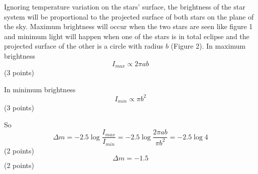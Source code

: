
Ignoring temperature variation on the stars' surface, the brightness of the
star system will be proportional to the projected surface of both stars on the
plane of the sky. Maximum brightness will occur when the two stars are seen
like figure 1 and minimum light will happen when one of the stars is in total
eclipse and the projected surface of the other is a circle with radius $b$
(Figure 2). In maximum brightness
\[ I_{max} \propto 2\pi a b \]
\hfill(3 points)

In minimum brightness
\[ I_{min} \propto \pi b^2 \]
\hfill(3 points)

So
\[ \Delta m = -2.5\log\frac{I_{max}}{I_{min}}
   = -2.5\log\frac{2\pi ab}{\pi b^2}
   = -2.5\log 4 \]
\hfill(2 points)
\[ \Delta m = -1.5 \]
\hfill(2 points)
